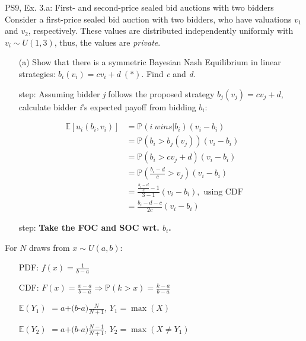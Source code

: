 \begin{frame}{PS9, Ex. 3.a: First- and second-price sealed bid auctions with two bidders}
    Consider a first-price sealed bid auction with two bidders, who have valuations $v_1$ and $v_2$, respectively. These values are distributed independently uniformly with $v_i\sim U(1,3)$, thus, the values are \textit{private}.
    \vspace{-4pt}
    \begin{itemize}
      \item[(a)] Show that there is a symmetric Bayesian Nash Equilibrium in linear strategies: $b_i(v_i) = cv_i + d\ (*)$. Find \textit{c} and \textit{d}.
    \end{itemize}
    \vspace{-8pt}
    \begin{multicols}{2}
      \begin{itemize}
        \item[\nth{1} step:] Assuming bidder \textit{j} follows the proposed strategy $b_j(v_j) = cv_j + d$, calculate bidder \textit{i}'s expected payoff from bidding $b_i$:
      \end{itemize}
      \vspace{-4pt}
      \begin{align*}
        \mathbb{E}[u_i(b_i,v_i)]&=\mathbb{P}(i\ wins|b_i)(v_i-b_i)\\
                                &=\mathbb{P}(b_i>b_j(v_j))(v_i-b_i)\\
                                &=\mathbb{P}(b_i>cv_j+d)(v_i-b_i)\\
                                &=\mathbb{P}\left(\frac{b_i-d}{c}>v_j\right)(v_i-b_i)\\
                                &=\frac{\frac{b_i-d}{c}-1}{3-1}(v_i-b_i),\text{ using CDF}\\
                                &=\frac{b_i-d-c}{2c}(v_i-b_i)
      \end{align*}
      \vspace{-10pt}
      \begin{itemize}
        \item[\nth{2} step:] \textbf{Take the FOC and SOC wrt. $b_i$.}
      \end{itemize}
      \vfill\null\columnbreak
      For $N$ draws from $x\sim U(a, b):$
      \vspace{-6pt}
      \begin{enumerate}
        \item[PDF:] $f(x)=\frac{1}{b-a}$
        \item[CDF:] $F(x)=\frac{x-a}{b-a}\Rightarrow\mathbb{P}(k>x)=\frac{k-a}{b-a}$
        \item[$\mathbb{E}(Y_1)$] $=a$+$(b$-$a)\frac{N}{N+1}$, $Y_1=\max(X)$
        \item[$\mathbb{E}(Y_2)$] $=a$+$(b$-$a)\frac{N-1}{N+1}$, $Y_2=\max(X\neq Y_1)$
      \end{enumerate}
      \vfill\null
    \end{multicols}
\end{frame}
